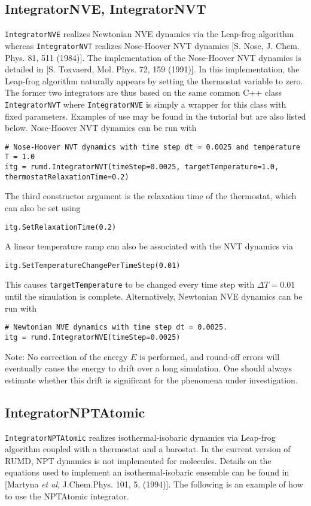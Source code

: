 \documentclass[a4paper]{article}
\begin{document}
\subsection{IntegratorNVE, IntegratorNVT}

\verb|IntegratorNVE| realizes Newtonian NVE dynamics via the Leap-frog algorithm whereas \verb|IntegratorNVT| realizes 
Nose-Hoover NVT dynamics [S. Nose, J. Chem. Phys. 81, 511 (1984)]. The implementation of 
the Nose-Hoover NVT dynamics is detailed in [S. Toxvaerd, Mol. Phys. 72, 159 (1991)]. In this implementation, 
the Leap-frog algorithm naturally appears by setting the thermostat variable to zero. The former two integrators are thus based on the same 
common C++ class \verb|IntegratorNVT| where \verb|IntegratorNVE| is simply a wrapper for this class with fixed parameters.
Examples of use may be found in the tutorial but are also listed below. Nose-Hoover NVT dynamics can be run with

\begin{verbatim}
# Nose-Hoover NVT dynamics with time step dt = 0.0025 and temperature T = 1.0
itg = rumd.IntegratorNVT(timeStep=0.0025, targetTemperature=1.0, thermostatRelaxationTime=0.2)
\end{verbatim}
The third constructor argument is the relaxation time of the thermostat, which can also be set using

\begin{verbatim}
itg.SetRelaxationTime(0.2)
\end{verbatim}
A linear temperature ramp can also be associated with the NVT dynamics via

\begin{verbatim}
itg.SetTemperatureChangePerTimeStep(0.01)
\end{verbatim}
This causes \verb|targetTemperature| to be changed every time step with $\Delta T = 0.01$ until the simulation is complete. Alternatively, Newtonian NVE dynamics can be run with

\begin{verbatim}
# Newtonian NVE dynamics with time step dt = 0.0025.
itg = rumd.IntegratorNVE(timeStep=0.0025)
\end{verbatim}
Note: No correction of the energy $E$ is performed, and round-off errors will eventually cause the energy to drift over a long simulation. One should always 
estimate whether this drift is significant for the phenomena under investigation.

\subsection{IntegratorNPTAtomic}
\verb|IntegratorNPTAtomic| realizes isothermal-isobaric dynamics via Leap-frog algorithm coupled with a thermostat and a barostat.
In the current version of RUMD, NPT dynamics is not implemented for molecules.
Details on the equations used to implement an isothermal-isobaric ensemble can be found in [Martyna \emph{et al}, J.Chem.Phys. 101, 5, (1994)].
The following is an example of how to use the NPTAtomic integrator.
\end{document}
